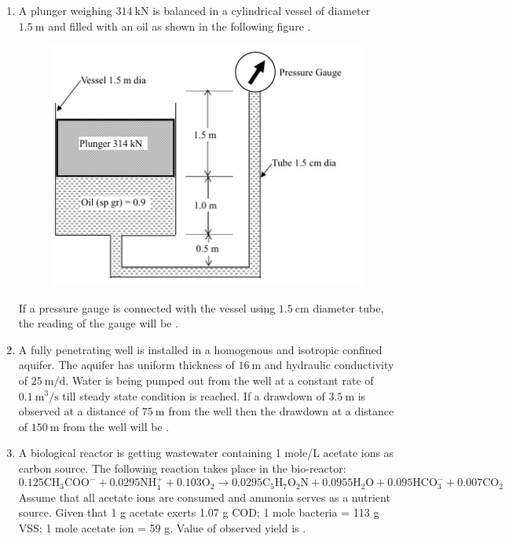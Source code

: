 \documentclass[journal,12pt,onecolumn]{IEEEtran}
\theoremstyle{remark}
\begin{document}
\begin{enumerate}
\newpage

\item A plunger weighing $314\ \text{kN}$ is balanced in a cylindrical vessel of diameter $1.5\ \text{m}$ and filled with an oil  as shown in the following figure .

\begin{center}
\begin{figure}[h]
    \centering
    \includegraphics[width=0.5\columnwidth]{figs/img 5 (2).jpeg}
    \caption{}
    \label{fig:placeholder}
\end{figure}

\end{center}

If a pressure gauge is connected with the vessel using $1.5\ \text{cm}$ diameter tube, the reading of the gauge will be \underline{\hspace{2cm}} . \hfill{}

\item A fully penetrating well is installed in a homogenous and isotropic confined aquifer. The aquifer has uniform thickness of $16\ \text{m}$ and hydraulic conductivity of $25\ \text{m/d}$. Water is being pumped out from the well at a constant rate of $0.1\ \text{m}^3/\text{s}$ till steady state condition is reached. If a drawdown of $3.5\ \text{m}$ is observed at a distance of $75\ \text{m}$ from the well then the drawdown at a distance of $150\ \text{m}$ from the well will be \underline{\hspace{2cm}} . \hfill{}

\newpage

\item A biological reactor is getting wastewater containing 1 mole/L acetate ions as carbon source. The following reaction takes place in the bio-reactor:
\[
0.125\mathrm{CH_3COO^-} + 0.0295\mathrm{NH_4^+} + 0.103\mathrm{O_2} \rightarrow 0.0295\mathrm{C_5H_7O_2N} + 0.0955\mathrm{H_2O} + 0.095\mathrm{HCO_3^-} + 0.007\mathrm{CO_2}
\]
Assume that all acetate ions are consumed and ammonia serves as a nutrient source. Given that 1 g acetate exerts 1.07 g COD; 1 mole bacteria = 113 g VSS; 1 mole acetate ion = 59 g. Value of observed yield is \underline{\hspace{2cm}} .  
\hfill{}


\end{enumerate}
\end{document}
